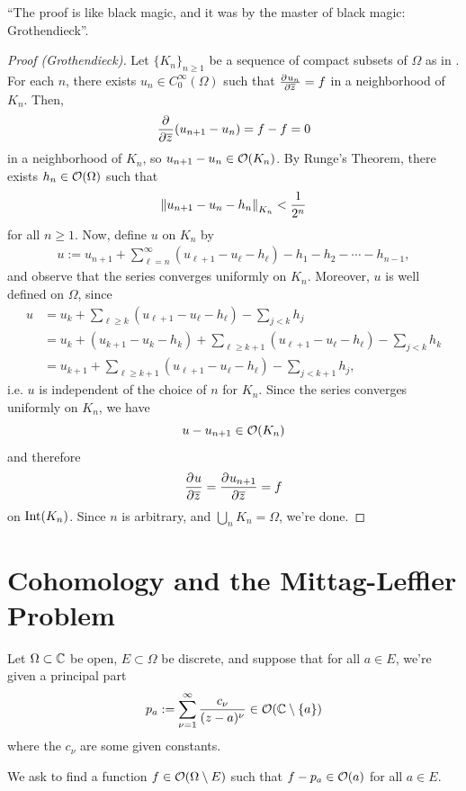 \documentclass[11pt]{article}
\begin{document}
``The proof is like black magic, and it was by the master of black magic: Grothendieck''.

\begin{proof}[Proof (Grothendieck)]
Let $\{K_n\}_{n \geq1}$ be a sequence of compact subsets of $\Omega$ as in . For each $n$, there exists $u_n \in C_0^\infty (\Omega)$ such that $\frac{\partial^{}u_n}{\partial \overline z^{}}=f$ in a neighborhood of $K_n$. Then,
$$\frac{\partial^{}}{\partial \overline z^{}}(u_{n+1}-u_n)=f-f=0$$
in a neighborhood of $K_n$, so $u_{n+1}-u_n \in \mathcal O(K_n)$. By Runge's Theorem, there exists $h_n \in \mathcal O(\Omega)$ such that
$$\left\lVert u_{n+1}-u_n-h_n \right\rVert_{K_n} < \frac{1}{2^n}$$
for all $n \geq 1$. Now, define $u$ on $K_n$ by
\begin{align} \label{eq:def-of-u}
    u:=u_{n+1}+\sum_{\ell = n}^\infty (u_{\ell+1}-u_{\ell}-h_{\ell})-h_1-h_2-\cdots- h_{n-1},
\end{align}
and observe that the series converges uniformly on $K_n$. Moreover, $u$ is well defined on $\Omega$, since
\begin{align*}
    u&=u_k + \sum_{\ell \geq k}(u_{\ell+1}-u_{\ell}-h_\ell)-\sum_{j<k}h_j
    \\ &= u_k+(u_{k+1}-u_k-h_k)+\sum_{\ell \geq k+1}(u_{\ell+1}-u_{\ell}-h_{\ell})-\sum_{j < k}h_k
    \\ &= u_{k+1}+\sum_{\ell \geq k+1}(u_{\ell+1}-u_\ell -h_\ell) - \sum_{j < k+1}h_j,
\end{align*}
i.e. $u$ is independent of the choice of $n$ for $K_n$. Since the series converges uniformly on $K_n$, we have
$$u-u_{n+1}\in \mathcal O(K_n)$$
and therefore
$$\frac{\partial^{}u}{\partial \overline z^{}}=\frac{\partial^{}u_{n+1}}{\partial \overline z^{}}=f$$
on $\operatorname{Int}(K_n)$. Since $n$ is arbitrary, and $\bigcup_{n}K_n = \Omega$, we're done.
\end{proof}

\section{Cohomology and the Mittag-Leffler Problem}

\begin{notebox}
   Let $\Omega \subset \mathbb{C}$ be open, $E \subset \Omega$ be discrete, and suppose that for all $a \in E$, we're given a principal part
$$p_a:=\sum_{\nu=1}^\infty \frac{c_\nu}{(z-a)^\nu} \in \mathcal O(\mathbb{C} \setminus \{a\})$$
where the $c_\nu$ are some given constants.

We ask to find a function $f\in \mathcal O(\Omega \setminus E)$ such that $f - p_a \in \mathcal O(a)$ for all $a \in E$.
\end{notebox}
\end{document}
